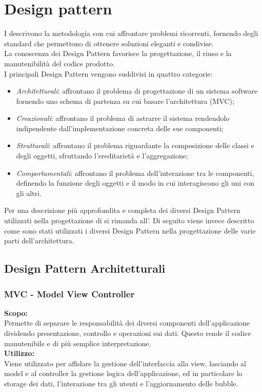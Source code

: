 \section{Design pattern}
I  descrivono la metodologia con cui affrontare problemi ricorrenti, fornendo degli standard che permettono di ottenere soluzioni eleganti e condivise.\\
La conoscenza dei Design Pattern favorisce la progettazione, il riuso e la manutenibilità del codice prodotto.\\
I principali Design Pattern vengono suddivisi in quattro categorie:
\begin{itemize}
	\item \textit{Architetturali}: affrontano il problema di progettazione di un sistema software fornendo uno schema di partenza su cui basare l'architettura (MVC);
	\item \textit{Creazionali}: affrontano il problema di astrarre il sistema rendendolo indipendente dall'implementazione concreta delle sue componenti;
	\item \textit{Strutturali}: affrontano il problema riguardante la composizione delle classi e degli oggetti, sfruttando l'ereditarietà e l'aggregazione;
	\item \textit{Comportamentali}: affrontano il problema dell'interazione tra le componenti, definendo la funzione degli oggetti e il modo in cui interagiscono gli uni con gli altri.
\end{itemize}
Per una descrizione più approfondita e completa dei diversi Design Pattern utilizzati nella progettazione di \ProjectName{} si rimanda all'. Di seguito viene invece descritto come sono stati utilizzati i diversi Design Pattern nella progettazione delle varie parti dell'architettura.

\subsection{Design Pattern Architetturali}

\subsubsection{MVC - Model View Controller}
\textbf{Scopo:}\\ 
Permette di separare le responsabilità dei diversi componenti dell'applicazione dividendo presentazione, controllo e operazioni sui dati. Questo rende il codice manutenibile e di più semplice interpretazione.\\
\textbf{Utilizzo:}\\
Viene utilizzato per affidare la gestione dell'interfaccia alla view, lasciando al model e al controller la gestione logica dell'applicazione, ed in particolare lo storage dei dati, l'interazione tra gli utenti e l'aggiornamento delle bubble.

